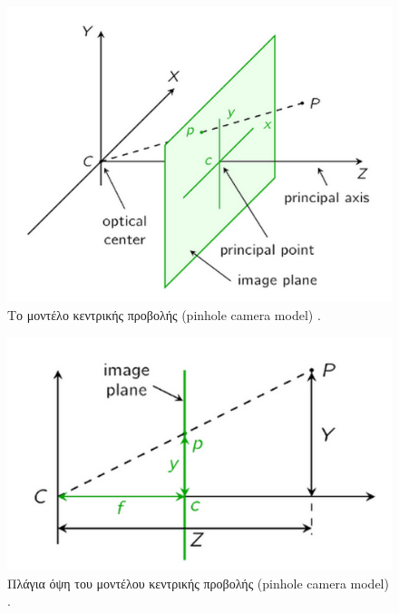 
\begin{figure}[H]
    \centering
    \includegraphics[scale=0.45, angle=0]{Files/Figures/pinhole1.png}
    \caption[Το μοντέλο κεντρικής προβολής στις 3 διαστάσεις (pinhole camera model)]{ Το μοντέλο κεντρικής προβολής (pinhole camera model) \cite{pinhole} .}
    \label{fig:pinhole1}
\end{figure}


\begin{figure}[H]
    \centering
    \includegraphics[scale=0.45, angle=0]{Files/Figures/pinhole2.png}
    \caption[Πλάγια όψη του μοντέλου κεντρικής προβολής 2D (pinhole camera model)]{ Πλάγια όψη του μοντέλου κεντρικής προβολής (pinhole camera model) \cite{pinhole} .}
    \label{fig:pinhole2}
\end{figure}

